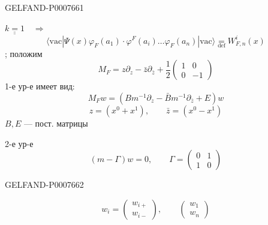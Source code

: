 \begin{GelfandAdjacentEvidence}{GELFAND-P000766}{1}

\(\underline{\underline{k=1}}\quad\Rightarrow\)
\begin{equation*}
\tag{20}
\langle\mathrm{vac}|\Psi(x)\varphi_F(a_1)\cdot\varphi^F(a_i)
\ldots\varphi_F(a_n)|\mathrm{vac}\rangle
\underset{\mathrm{def}}{=}W^i_{F,n}(x)
\end{equation*}
; положим
\begin{equation*}
\tag{21}
M_F=z\partial_z-\bar z\partial_{\bar z}+\frac12
\begin{pmatrix}1&0\\0&-1\end{pmatrix}
\end{equation*}
1-е ур-е имеет вид:
\begin{equation*}
\tag{22}
M_Fw=(Bm^{-1}\partial_z-\bar Bm^{-1}\partial_{\bar z}+E)w
\end{equation*}
\[
z=(x^0+x^1),\qquad\bar z=(x^0-x^1)
\]
\(B,E\) --- пост. матрицы

2-е ур-е
\begin{equation*}
\tag{23}
(m-\Gamma)w=0,\qquad\Gamma=\begin{pmatrix}0&1\\1&0\end{pmatrix}
\end{equation*}
\end{GelfandAdjacentEvidence}
\begin{GelfandAdjacentEvidence}{GELFAND-P000766}{2}

\[
w_i=\begin{pmatrix}w_{i+}\\w_{i-}\end{pmatrix},\qquad
\begin{pmatrix}w_1\\w_n\end{pmatrix}
\]
\end{GelfandAdjacentEvidence}
